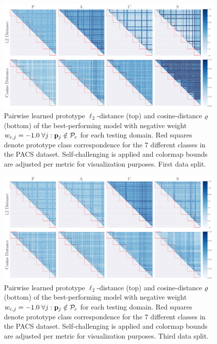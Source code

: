 \begin{figure}[ht]
    \centering
    \includegraphics[width=\textwidth]{Figures/Chapter4/2021-01-21-ProDropIncorrectWeight-1.0WithSCdrop_f0.5SAVEResNet18oracle_validation_trial0.pdf}
    \caption[First data split pairwise self-challenging prototype distances with $w_{c,j} = -1.0$] {Pairwise learned prototype $\ell_2$-distance (top) and cosine-distance $\varrho$ (bottom) of the best-performing model with negative weight $w_{c,j} = -1.0\; \forall j: \mathbf{p}_{j} \notin \mathcal{P}_c$ for each testing domain. Red squares denote prototype class correspondence for the $7$ different classes in the PACS dataset. Self-challenging is applied and colormap bounds are adjusted per metric for visualization purposes. First data split.}
    \label{fig:pairwise_distance_sc}
\end{figure}

\begin{figure}[ht]
    \centering
    \includegraphics[width=\textwidth]{Figures/Chapter4/2021-01-21-ProDropIncorrectWeight-1.0WithSCdrop_f0.5SAVEResNet18oracle_validation_trial2.pdf}
    \caption[Third data split pairwise self-challenging prototype distances with $w_{c,j} = -1.0$] {Pairwise learned prototype $\ell_2$-distance (top) and cosine-distance $\varrho$ (bottom) of the best-performing model with negative weight $w_{c,j} = -1.0\; \forall j: \mathbf{p}_{j} \notin \mathcal{P}_c$ for each testing domain. Red squares denote prototype class correspondence for the $7$ different classes in the PACS dataset. Self-challenging is applied and colormap bounds are adjusted per metric for visualization purposes. Third data split.}
\end{figure}


